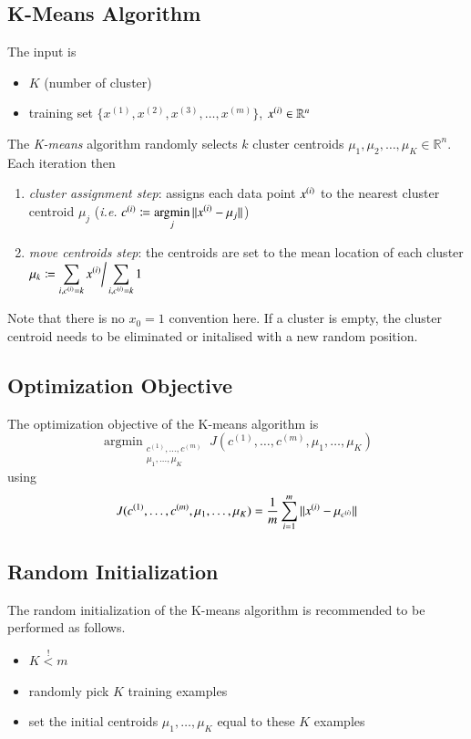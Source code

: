 \documentclass[a4paper,twoside,10pt]{article}
\begin{document}
\subsection{K-Means Algorithm}
The input is
\begin{itemize}
  \item $K$ (number of cluster)
  \item training set $\{x^{(1)},x^{(2)},x^{(3)},\ldots,x^{(m)}\}$, $x^{(i)}\in\mathbb{R}^n$
\end{itemize}
The \emph{K-means} algorithm randomly selects $k$ cluster centroids
$\mu_1,\mu_2,\ldots,\mu_K\in\mathbb{R}^n$.
Each iteration then
\begin{enumerate}
  \item \emph{cluster assignment step}: assigns each data point $x^{(i)}$ to the nearest cluster centroid $\mu_j$ (\emph{i.e.} $c^{(i)}\coloneqq\displaystyle\mathop{\operatorname{argmin}}_j ||x^{(i)}-\mu_j||$)
  \item \emph{move centroids step}: the centroids are set to the mean location of each cluster $\mu_k\coloneqq\displaystyle\sum_{i,c^{(i)}=k}x^{(i)}\bigg/\sum_{i,c^{(i)}=k}1$
\end{enumerate}
Note that there is no $x_0=1$ convention here.
If a cluster is empty, the cluster centroid needs to be eliminated or initalised with a new random position.

\subsection{Optimization Objective}
The optimization objective of the K-means algorithm is
\begin{equation*}
  \mathop{\operatorname{argmin}}_{\substack{c^{(1)},\ldots,c^{(m)}\\\mu_1,\ldots,\mu_K}}J(c^{(1)},\ldots,c^{(m)},\mu_1,\ldots,\mu_K)
\end{equation*}
using
\begin{equation}\label{equ:kmeanscost}
  J(c^{(1)},\ldots,c^{(m)},\mu_1,\ldots,\mu_K)=\frac{1}{m}\displaystyle\sum_{i=1}^m||x^{(i)}-\mu_{c^{(i)}}||
\end{equation}

\subsection{Random Initialization}
The random initialization of the K-means algorithm is recommended to be performed as follows.
\begin{itemize}
  \item $K\overset{!}{<}m$
  \item randomly pick $K$ training examples
  \item set the initial centroids $\mu_1,\ldots,\mu_K$ equal to these $K$ examples
\end{itemize}
\end{document}
